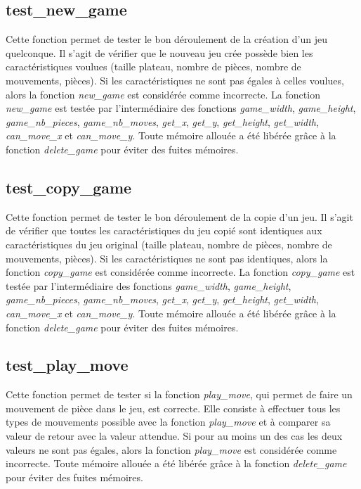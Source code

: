 \documentclass{report}
\begin{document}
\subsection{test\_new\_game}
Cette fonction permet de tester le bon déroulement de la création d'un jeu quelconque. Il s'agit de vérifier que le nouveau jeu crée possède bien les caractéristiques voulues (taille plateau, nombre de pièces, nombre de mouvements, pièces). Si les caractéristiques ne sont pas égales à celles voulues, alors la fonction \emph{new\_game} est considérée comme incorrecte. La fonction \emph{new\_game} est testée par l'intermédiaire des fonctions \emph{game\_width}, \emph{game\_height}, \emph{game\_nb\_pieces}, \emph{game\_nb\_moves}, \emph{get\_x}, \emph{get\_y}, \emph{get\_height}, \emph{get\_width}, \emph{can\_move\_x} et \emph{can\_move\_y}. Toute mémoire allouée a été libérée grâce à la fonction \emph{delete\_game} pour éviter des fuites mémoires.
\subsection{test\_copy\_game}
Cette fonction permet de tester le bon déroulement de la copie d'un jeu. Il s'agit de vérifier que toutes les caractéristiques du jeu copié sont identiques aux caractéristiques du jeu original (taille plateau, nombre de pièces, nombre de mouvements, pièces). Si les caractéristiques ne sont pas identiques, alors la fonction \emph{copy\_game} est considérée comme incorrecte. La fonction \emph{copy\_game} est testée par l'intermédiaire des fonctions \emph{game\_width}, \emph{game\_height}, \emph{game\_nb\_pieces}, \emph{game\_nb\_moves}, \emph{get\_x}, \emph{get\_y}, \emph{get\_height}, \emph{get\_width}, \emph{can\_move\_x} et \emph{can\_move\_y}. Toute mémoire allouée a été libérée grâce à la fonction \emph{delete\_game} pour éviter des fuites mémoires.
\subsection{test\_play\_move}
Cette fonction permet de tester si la fonction \emph{play\_move}, qui permet de faire un mouvement de pièce dans le jeu, est correcte. Elle consiste à effectuer tous les types de mouvements possible avec la fonction \emph{play\_move} et à comparer sa valeur de retour avec la valeur attendue. Si pour au moins un des cas les deux valeurs ne sont pas égales, alors la fonction \emph{play\_move} est considérée comme incorrecte. Toute mémoire allouée a été libérée grâce à la fonction \emph{delete\_game} pour éviter des fuites mémoires.
\end{document}
